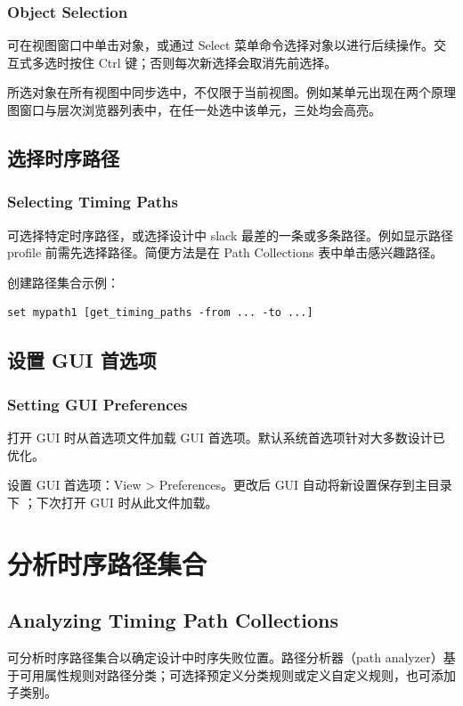 \subsubsection*{Object Selection}

可在视图窗口中单击对象，或通过 Select 菜单命令选择对象以进行后续操作。交互式多选时按住 Ctrl 键；否则每次新选择会取消先前选择。

所选对象在所有视图中同步选中，不仅限于当前视图。例如某单元出现在两个原理图窗口与层次浏览器列表中，在任一处选中该单元，三处均会高亮。

\subsection{选择时序路径}
\subsubsection*{Selecting Timing Paths}

可选择特定时序路径，或选择设计中 slack 最差的一条或多条路径。例如显示路径 profile 前需先选择路径。简便方法是在 Path Collections 表中单击感兴趣路径。

创建路径集合示例：
\begin{lstlisting}
set mypath1 [get_timing_paths -from ... -to ...]
\end{lstlisting}

\subsection{设置 GUI 首选项}
\subsubsection*{Setting GUI Preferences}

打开 GUI 时从首选项文件加载 GUI 首选项。默认系统首选项针对大多数设计已优化。

设置 GUI 首选项：View > Preferences。更改后 GUI 自动将新设置保存到主目录下 ；下次打开 GUI 时从此文件加载。

\section{分析时序路径集合}
\subsection*{Analyzing Timing Path Collections}

可分析时序路径集合以确定设计中时序失败位置。路径分析器（path analyzer）基于可用属性规则对路径分类；可选择预定义分类规则或定义自定义规则，也可添加子类别。

